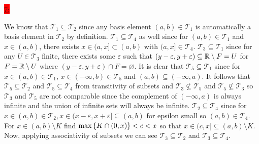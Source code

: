\documentclass{exam}
\begin{document}
\colorbox{red}{\underline{7:}}
\begin{solution}
    We know that $\mathcal{T}_1 \subseteq \mathcal{T}_2$ since any basis element $(a, b) \in \mathcal{T}_1$ is automatically a basis element in $\mathcal{T}_2$ by definition. $\mathcal{T}_1 \subseteq \mathcal{T}_4$ as well since for $(a, b) \in \mathcal{T}_1$ and $x \in (a, b)$, there exists $x \in (a, x] \subset (a, b)$ with $(a, x] \in \mathcal{T}_4$. $\mathcal{T}_3 \subseteq \mathcal{T}_1$ since for any $U \in \mathcal{T}_3$ finite, there exists some $\varepsilon$ such that $(y - \varepsilon, y + \varepsilon) \subseteq \mathbb R \setminus F = U$ for $F = \mathbb R \setminus U$ where $(y - \varepsilon, y + \varepsilon) \cap F = \varnothing$. It is clear that $\mathcal{T}_5 \subseteq \mathcal{T}_1$ since for $x \in (a, b) \in \mathcal{T}_1$, $x \in (-\infty, b) \in \mathcal{T}_5$ and $(a, b) \subseteq (-\infty, a)$. It follows that $\mathcal{T}_5 \subseteq \mathcal{T}_2$ and $\mathcal{T}_5 \subseteq \mathcal{T}_4$ from transitivity of subsets and $\mathcal{T}_3 \not\subseteq \mathcal{T}_5$ and $\mathcal{T}_5 \not\subseteq \mathcal{T}_3$ so $\mathcal{T}_3$ and $\mathcal{T}_5$ are not comparable since the complement of $\left(-\infty, a\right)$ is always infinite and the union of infinite sets will always be infinite. $\mathcal{T}_2 \subseteq \mathcal{T}_4$ since for $x \in (a, b) \in \mathcal{T}_2, x \in (x - \varepsilon, x + \varepsilon] \subseteq (a, b)$ for epsilon small so $(a, b) \in \mathcal{T}_4$. For $x \in (a, b) \setminus K$ find $\max\left\{K \cap (0, x) \right\} < c < x$ so that $x \in (c, x] \subseteq (a, b) \setminus K$. Now, applying associativity of subsets we can see $\mathcal{T}_3 \subseteq \mathcal{T}_2$ and $\mathcal{T}_3 \subseteq \mathcal{T}_4$.
\end{solution}
\end{document}
